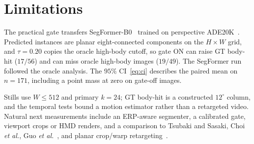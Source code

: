\section{Limitations}
\label{sec:limitations}

The practical gate transfers SegFormer-B0~\cite{xie2021segformer}
trained on perspective {ADE20K}~\cite{zhou2017ade20k}. Predicted
instances are planar eight-connected components on the
$H\times W$ grid, and $\tau=0.20$ copies the oracle high-body
cutoff, so gate ON can raise GT body-hit ($17/56$) and can miss
oracle high-body images ($19/49$). The SegFormer run followed
the oracle analysis. The $95\%$ CI~\eqref{eq:ci} describes the
paired mean on $n=171$, including a point mass at zero on
gate-off images.

Stills use $W\le 512$ and primary $k=24$; GT body-hit is a
constructed $12^\circ$ column, and the temporal tests bound a
motion estimator rather than a retargeted video. Natural next
measurements include an ERP-aware segmenter, a calibrated gate,
viewport crops or HMD renders, and a comparison to Tsubaki and
Sasaki, Choi \emph{et al.}, Guo
\emph{et al.}~\cite{tsubaki2018interrupted,choi2021distortion,guo2023dinn360},
and planar crop/warp
retargeting~\cite{wang2008scale,pritch2009shiftmap,rubinstein2010comparative}.
